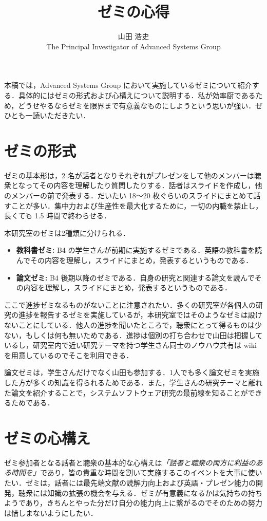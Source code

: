 \documentclass[a4j]{jarticle}
\title{\gt ゼミの心得}
\author{山田 浩史 \\ The Principal Investigator of Advanced Systems Group}
\date{}
\begin{document}
\maketitle

本稿では，Advanced Systems Group において実施しているゼミについて紹介する．具体的にはゼミの形式および心構えについて説明する．私が効率厨であるため，どうせやるならゼミを限界まで有意義なものにしようという思いが強い．ぜひとも一読いただきたい．

\section*{ゼミの形式}
ゼミの基本形は，2 名が話者となりそれぞれがプレゼンをして他のメンバーは聴衆となってその内容を理解したり質問したりする．話者はスライドを作成し，他のメンバーの前で発表する．だいたい 18〜20 枚ぐらいのスライドにまとめて話すことが多い．集中力および生産性を最大化するために，一切の内職を禁止し，長くても 1.5 時間で終わらせる．

本研究室のゼミは2種類に分けられる．

\begin{itemize}
 \item \textbf{教科書ゼミ:} B4 の学生さんが前期に実施するゼミである．英語の教科書を読んでその内容を理解し，スライドにまとめ，発表するというものである．
 \item \textbf{論文ゼミ:} B4 後期以降のゼミである．自身の研究と関連する論文を読んでその内容を理解し，スライドにまとめ，発表するというものである．
\end{itemize}

ここで進捗ゼミなるものがないことに注意されたい．多くの研究室が各個人の研究の進捗を報告するゼミを実施しているが，本研究室ではそのようなゼミは設けないことにしている．他人の進捗を聞いたところで，聴衆にとって得るものは少ない，もしくは何も無いためである．進捗は個別の打ち合わせで山田は把握しているし，研究室内で近い研究テーマを持つ学生さん同士のノウハウ共有は wiki を用意しているのでそこを利用できる．

論文ゼミは，学生さんだけでなく山田も参加する．1人でも多く論文ゼミを実施した方が多くの知識を得られるためである．また，学生さんの研究テーマと離れた論文を紹介することで，システムソフトウェア研究の最前線を知ることができるためである．

\section*{ゼミの心構え}
ゼミ参加者となる話者と聴衆の基本的な心構えは\emph{「話者と聴衆の両方に利益のある時間を」}であり，皆の貴重な時間を割いて実施するこのイベントを大事に使いたい．ゼミは，話者には最先端文献の読解力向上および英語・プレゼン能力の開発，聴衆には知識の拡張の機会を与える．ゼミが有意義になるかは気持ちの持ちようであり，きちんとやった分だけ自分の能力向上に繋がるのでそのための努力は惜しまないようにしたい．
\end{document}
